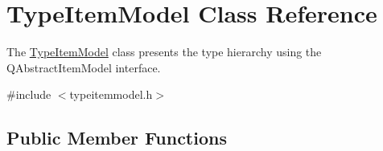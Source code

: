 \hypertarget{class_type_item_model}{\section{\-Type\-Item\-Model \-Class \-Reference}
\label{class_type_item_model}
}


\-The \hyperlink{class_type_item_model}{\-Type\-Item\-Model} class presents the type hierarchy using the \-Q\-Abstract\-Item\-Model interface.  




{\ttfamily \#include $<$typeitemmodel.\-h$>$}

\subsection*{\-Public \-Member \-Functions}
